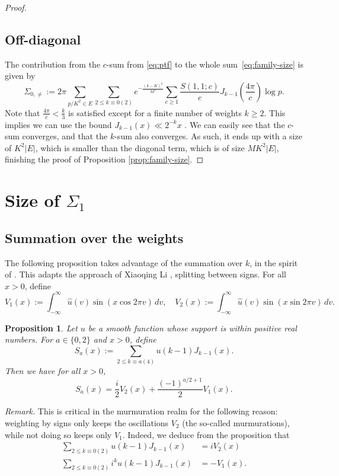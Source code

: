\documentclass[reqno, 12pt]{amsart}
\newtheorem{prop}{Proposition}
\renewcommand{\geq}{\geqslant}
\renewcommand{\leq}{\leqslant}
\begin{document}
\begin{proof}
\subsection{Off-diagonal}
The contribution from the $c$-sum from \eqref{eq:ptf} to the whole sum~\eqref{eq:family-size} is given by
\[ \Sigma_{0,\neq} := 2\pi \sum_{p/K^2 \in E} \sum_{2 \leq k \equiv 0(2)} e^{-\frac{(k-K)^2}{M^2}} \sum_{c \geq 1} \frac{S(1,1;c)}{c} J_{k-1} \left( \frac{4\pi}{c} \right) \log p. \]
Note that $\frac{4\pi}{c} < \frac{k}{3}$ is satisfied except for a finite number of weights $k \geqslant 2$. This implies we can use the bound $J_{k-1}(x) \ll 2^{-k} x$ \cite[(2.11'{}'{}')]{iwaniec_low_2000}. We can easily see that the $c$-sum converges, and that the $k$-sum also converges. As such, it ends up with a size of $K^2|E|$, which is smaller than the diagonal term, which is of size $MK^2|E|$, finishing the proof of Proposition \ref{prop:family-size}.
\end{proof}
 
\section{Size of $\Sigma_1$}

\subsection{Summation over the weights}

The following proposition takes advantage of the summation over $k$, in the spirit of \cite[Section 8]{iwaniec_low_2000}. This adapts the approach of Xiaoqing Li \cite{li_bounds_2011}, splitting between signs. {For all $x > 0$, define}
\[ V_1(x) := \int_{-\infty}^\infty \hat{u}(v) \sin(x \cos 2\pi v) \,dv, \quad V_2(x) := \int_{-\infty}^\infty \hat{u}(v) \sin (x \sin 2\pi v) \,dv. \]

\begin{prop}
\label{prop:summation-k}
{Let $u$ be a smooth function whose support is within positive real numbers.} For $a \in \{0, 2\}$ and $x>0$, {define}
\[ S_a(x) := \sum_{2 \leq k \equiv a (4)} u(k-1) J_{k-1}(x).\]
Then we have for all $x>0$, 
\[ S_a(x) = \frac{i}{2} V_2(x) + \frac{(-1)^{a/2+1}}{2} V_1(x). \]
\end{prop}

\noindent \textit{Remark.} This is critical in the murmuration realm for the following reason: weighting by signs {only} keeps the oscillations $V_2$ (the so-called murmurations), while not doing so keeps {only} $V_1$. Indeed, we deduce from the proposition that
\begin{align}
\sum_{2 \leq k \equiv 0 (2)} u(k-1) J_{k-1}(x) & = i {V_2}(x) \\
\sum_{2 \leq k \equiv 0 (2)}  i^k u(k-1) J_{k-1}(x) & = -{V_1}(x).
\end{align}
\end{document}
